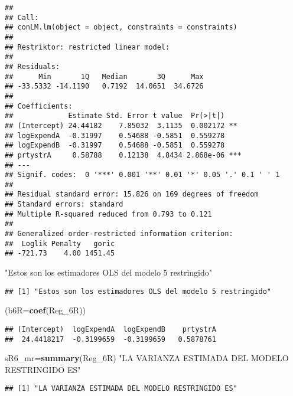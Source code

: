 \documentclass[
]{article}
\newenvironment{Shaded}{\begin{snugshade}}{\end{snugshade}}
\newcommand{\DataTypeTok}[1]{\textcolor[rgb]{0.13,0.29,0.53}{#1}}
\newcommand{\KeywordTok}[1]{\textcolor[rgb]{0.13,0.29,0.53}{\textbf{#1}}}
\newcommand{\NormalTok}[1]{#1}
\newcommand{\StringTok}[1]{\textcolor[rgb]{0.31,0.60,0.02}{#1}}
\begin{document}
\begin{verbatim}
## 
## Call:
## conLM.lm(object = object, constraints = constraints)
## 
## Restriktor: restricted linear model:
## 
## Residuals:
##      Min       1Q   Median       3Q      Max 
## -33.5332 -14.1190   0.7192  14.0651  34.6726 
## 
## Coefficients:
##             Estimate Std. Error t value  Pr(>|t|)    
## (Intercept) 24.44182    7.85032  3.1135  0.002172 ** 
## logExpendA  -0.31997    0.54688 -0.5851  0.559278    
## logExpendB  -0.31997    0.54688 -0.5851  0.559278    
## prtystrA     0.58788    0.12138  4.8434 2.868e-06 ***
## ---
## Signif. codes:  0 '***' 0.001 '**' 0.01 '*' 0.05 '.' 0.1 ' ' 1
## 
## Residual standard error: 15.826 on 169 degrees of freedom
## Standard errors: standard 
## Multiple R-squared reduced from 0.793 to 0.121 
## 
## Generalized order-restricted information criterion: 
##  Loglik Penalty   goric 
## -721.73    4.00 1451.45
\end{verbatim}

\begin{Shaded}
\begin{Highlighting}[]
\StringTok{"Estos son los estimadores OLS del modelo 5 restringido"}
\end{Highlighting}
\end{Shaded}

\begin{verbatim}
## [1] "Estos son los estimadores OLS del modelo 5 restringido"
\end{verbatim}

\begin{Shaded}
\begin{Highlighting}[]
\NormalTok{(}\DataTypeTok{b6R=}\KeywordTok{coef}\NormalTok{(Reg_6R))}
\end{Highlighting}
\end{Shaded}

\begin{verbatim}
## (Intercept)  logExpendA  logExpendB    prtystrA 
##  24.4418217  -0.3199659  -0.3199659   0.5878761
\end{verbatim}

\begin{Shaded}
\begin{Highlighting}[]
\NormalTok{sR6_mr=}\KeywordTok{summary}\NormalTok{(Reg_6R)}
\StringTok{"LA VARIANZA ESTIMADA DEL MODELO RESTRINGIDO ES"}
\end{Highlighting}
\end{Shaded}

\begin{verbatim}
## [1] "LA VARIANZA ESTIMADA DEL MODELO RESTRINGIDO ES"
\end{verbatim}
\end{document}

